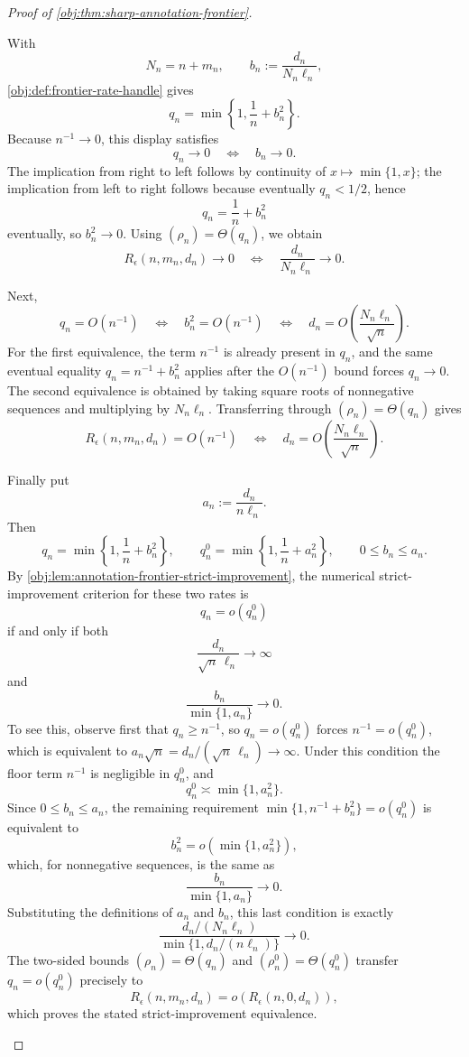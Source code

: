 \begin{proof}[Proof of \cref{obj:thm:sharp-annotation-frontier}]
\begin{enumerate}
With
\[
N_n=n+m_n,\qquad
b_n:=\frac{d_n}{N_n\ell_n},
\]
\cref{obj:def:frontier-rate-handle} gives
\[
q_n=\min\left\{1,\frac1n+b_n^2\right\}.
\]
Because \(n^{-1}\to0\), this display satisfies
\[
q_n\to0
\quad\Longleftrightarrow\quad
b_n\to0.
\]
The implication from right to left follows by continuity of \(x\mapsto\min\{1,x\}\); the implication from left to right follows because eventually \(q_n<1/2\), hence
\[
q_n=\frac1n+b_n^2
\]
eventually, so \(b_n^2\to0\).  Using \((\rho_n)=\Theta(q_n)\), we obtain
\[
R_\epsilon(n,m_n,d_n)\to0
\quad\Longleftrightarrow\quad
\frac{d_n}{N_n\ell_n}\to0.
\]

Next,
\[
q_n=O(n^{-1})
\quad\Longleftrightarrow\quad
b_n^2=O(n^{-1})
\quad\Longleftrightarrow\quad
d_n=O\!\left(\frac{N_n\ell_n}{\sqrt n}\right).
\]
For the first equivalence, the term \(n^{-1}\) is already present in \(q_n\), and the same eventual equality
\(q_n=n^{-1}+b_n^2\) applies after the \(O(n^{-1})\) bound forces \(q_n\to0\).  The second equivalence is obtained by taking square roots of nonnegative sequences and multiplying by \(N_n\ell_n\).  Transferring through \((\rho_n)=\Theta(q_n)\) gives
\[
R_\epsilon(n,m_n,d_n)=O(n^{-1})
\quad\Longleftrightarrow\quad
d_n=O\!\left(\frac{N_n\ell_n}{\sqrt n}\right).
\]

Finally put
\[
a_n:=\frac{d_n}{n\ell_n}.
\]
Then
\[
q_n=\min\left\{1,\frac1n+b_n^2\right\},
\qquad
q_n^{0}=\min\left\{1,\frac1n+a_n^2\right\},
\qquad
0\le b_n\le a_n .
\]
By \cref{obj:lem:annotation-frontier-strict-improvement}, the numerical strict-improvement
criterion for these two rates is
\[
q_n=o(q_n^{0})
\]
if and only if both
\[
\frac{d_n}{\sqrt n\,\ell_n}\to\infty
\]
and
\[
\frac{b_n}{\min\{1,a_n\}}\to0.
\]
To see this, observe first that \(q_n\ge n^{-1}\), so \(q_n=o(q_n^{0})\) forces
\(n^{-1}=o(q_n^{0})\), which is equivalent to
\(a_n\sqrt n=d_n/(\sqrt n\,\ell_n)\to\infty\).  Under this condition the floor term \(n^{-1}\) is negligible in \(q_n^{0}\), and
\[
q_n^{0}\asymp \min\{1,a_n^2\}.
\]
Since \(0\le b_n\le a_n\), the remaining requirement
\(\min\{1,n^{-1}+b_n^2\}=o(q_n^{0})\) is equivalent to
\[
b_n^2=o(\min\{1,a_n^2\}),
\]
which, for nonnegative sequences, is the same as
\[
\frac{b_n}{\min\{1,a_n\}}\to0.
\]
Substituting the definitions of \(a_n\) and \(b_n\), this last condition is exactly
\[
\frac{d_n/(N_n\ell_n)}
{\min\{1,d_n/(n\ell_n)\}}
\to0.
\]
The two-sided bounds \((\rho_n)=\Theta(q_n)\) and \((\rho_n^{0})=\Theta(q_n^{0})\) transfer
\(q_n=o(q_n^{0})\) precisely to
\[
R_\epsilon(n,m_n,d_n)
=
o\!\left(R_\epsilon(n,0,d_n)\right),
\]
which proves the stated strict-improvement equivalence. %
\end{enumerate}
\end{proof}
